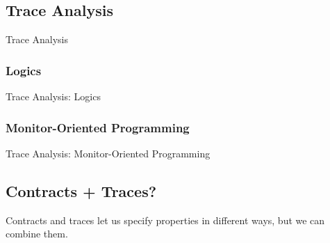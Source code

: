 \documentclass[12pt]{beamer}
\begin{document}

\subsection{Trace Analysis}
\label{sec:runver-trace}

\begin{frame}{Trace Analysis}

\end{frame}

\subsubsection{Logics}
\label{sec:runver-trace-log}

\begin{frame}{Trace Analysis: Logics}

\end{frame}

\subsubsection{Monitor-Oriented Programming}
\label{sec:runver-trace-mop}

\begin{frame}{Trace Analysis: Monitor-Oriented Programming}

\end{frame}


\subsection{Contracts + Traces?}
\label{sec:runver-tbc}

\begin{frame}
  \begin{center}
    \Large Contracts and traces let us specify properties in different
    ways, but we can combine them.
  \end{center}
\end{frame}
\end{document}
